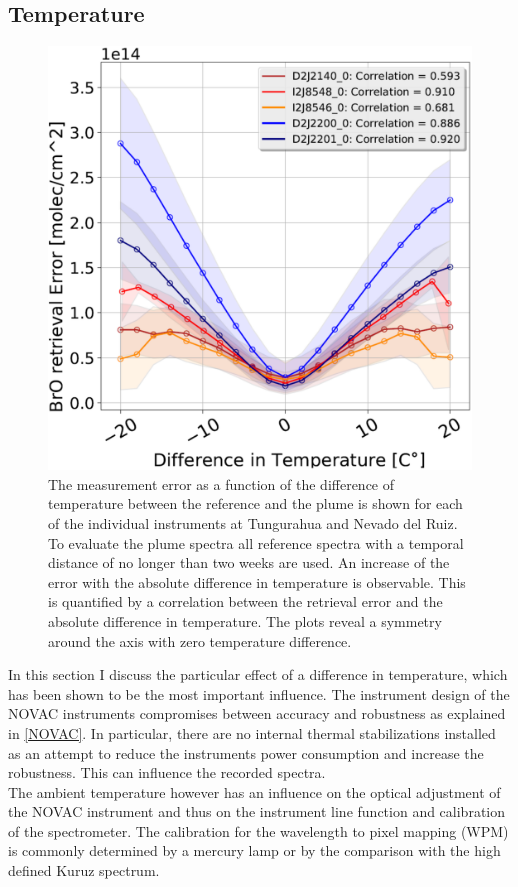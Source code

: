 \subsection{Temperature}
\begin{figure}
	\centering
	\includegraphics[width=0.7\linewidth]{Bilder/DiffTempallInstruments1}
	\caption{The  measurement error as a function of the difference of temperature between the reference and the plume is shown for each of the individual instruments at Tungurahua and Nevado del Ruiz. To evaluate the plume spectra all reference spectra with a temporal distance of no longer than two weeks are used. An increase of the  error with the absolute difference in temperature is observable. This is quantified by a correlation between the  retrieval error and the absolute difference in temperature. The plots reveal a symmetry around the axis with zero temperature difference.}
	\label{fig:difftemp}
\end{figure}
In this section I discuss the particular effect of a difference in temperature, which has been shown to be the most important influence.
The instrument design of the NOVAC instruments compromises between accuracy and robustness as explained in \cref{NOVAC}. In particular, there are no internal thermal stabilizations installed as an attempt to reduce the instruments power consumption and increase the robustness. This can influence the recorded spectra.\\
The ambient temperature however has an influence on the optical adjustment of the NOVAC instrument and thus on the instrument line function and calibration of the spectrometer.
The calibration for the wavelength to pixel mapping (WPM) is commonly determined by a mercury lamp or by the comparison with the high defined Kuruz spectrum.
